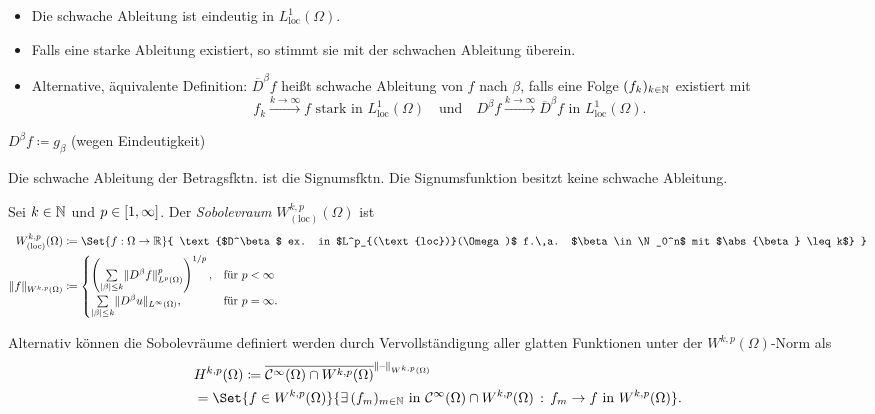 \documentclass{cheat-sheet}
\begin{document}
\begin{bem}
  \begin{itemize}
    \item Die schwache Ableitung ist eindeutig in $L^1_{\text{loc}}(\Omega)$.
    \item Falls eine starke Ableitung existiert, so stimmt sie mit der schwachen Ableitung überein.
    \item Alternative, äquivalente Definition: $\overline{D}^\beta f$ heißt schwache Ableitung von $f$ nach $\beta$, falls eine Folge $(f_k)_{k \in \mathbb{N}}$ existiert mit
    \[
      f_k \xrightarrow{k \to \infty} f \text{ stark in } L^1_{\text{loc}}(\Omega)
      \quad \text{und} \quad
      D^\beta f \xrightarrow{k \to \infty} \overline{D}^\beta f \text{ in } L^1_{\text{loc}}(\Omega).
    \]
  \end{itemize}
\end{bem}

\begin{nota}
  $D^\beta f \coloneqq g_\beta$ (wegen Eindeutigkeit)
\end{nota}

\begin{bsp}
  Die schwache Ableitung der Betragsfktn. ist die Signumsfktn. Die Signumsfunktion besitzt keine schwache Ableitung.
\end{bsp}


\begin{defn}
  Sei $k \in \mathbb{N}$ und $p \in \left[ 1, \infty \right]$. Der \emph{Sobolevraum} $W^{k,p}_{(\text{loc})}(\Omega)$ ist
  \begin{align*}
    W^{k,p}_{(\text{loc})}(\Omega) & \coloneqq \Set{ f : \Omega \to \R }{ \text{$D^\beta$ ex. in $L^p_{(\text{loc})}(\Omega)$ f.\,a. $\beta \in \N_0^n$ mit $\abs{\beta} \leq k$} } \\
    \norm{f}_{W^{k,p}(\Omega)} & \coloneqq \begin{cases}
      \left( \sum_{\abs{\beta} \leq k} \norm{D^\beta f}^p_{L^p(\Omega)} \right)^{1/p}, & \text{für } p < \infty \\
      \sum_{\abs{\beta} \leq k} \norm{D^\beta u}_{L^\infty(\Omega)}, & \text{für } p = \infty.
    \end{cases}
  \end{align*}
\end{defn}

\begin{bem}
  Alternativ können die Sobolevräume definiert werden durch Vervollständigung aller glatten Funktionen unter der $W^{k,p}(\Omega)$-Norm als
  \begin{align*}
    & H^{k,p}(\Omega) \coloneqq \overline{\mathcal{C}^\infty(\Omega) \cap W^{k,p}(\Omega)}^{\norm{\blank}_{W^{k,p}(\Omega)}} \\
    & = \Set{ f \in W^{k,p}(\Omega) }{ \ex{(f_m)_{m \in \N} \text{ in } \mathcal{C}^\infty(\Omega) \cap W^{k,p}(\Omega)} f_m \to f \text{ in } W^{k,p}(\Omega)}.
  \end{align*}
\end{bem}
\end{document}
